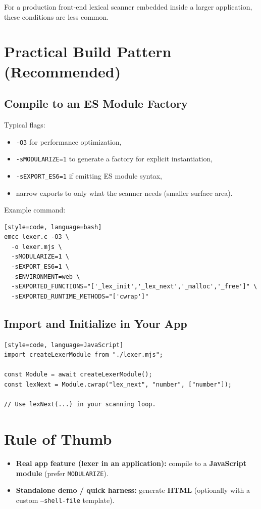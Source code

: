 \documentclass[11pt]{article}
\begin{document}
For a production front-end lexical scanner embedded inside a larger application, these conditions are less common.

\section*{Practical Build Pattern (Recommended)}
\subsection*{Compile to an ES Module Factory}
Typical flags:
\begin{itemize}[leftmargin=*, itemsep=0.25em]
  \item \texttt{-O3} for performance optimization,
  \item \texttt{-sMODULARIZE=1} to generate a factory for explicit instantiation,
  \item \texttt{-sEXPORT\_ES6=1} if emitting ES module syntax,
  \item narrow exports to only what the scanner needs (smaller surface area).
\end{itemize}

\noindent Example command:
\begin{verbatim}[style=code, language=bash]
emcc lexer.c -O3 \
  -o lexer.mjs \
  -sMODULARIZE=1 \
  -sEXPORT_ES6=1 \
  -sENVIRONMENT=web \
  -sEXPORTED_FUNCTIONS="['_lex_init','_lex_next','_malloc','_free']" \
  -sEXPORTED_RUNTIME_METHODS="['cwrap']"
\end{verbatim}

\subsection*{Import and Initialize in Your App}
\begin{verbatim}[style=code, language=JavaScript]
import createLexerModule from "./lexer.mjs";

const Module = await createLexerModule();
const lexNext = Module.cwrap("lex_next", "number", ["number"]);

// Use lexNext(...) in your scanning loop.
\end{verbatim}

\section*{Rule of Thumb}
\begin{itemize}[leftmargin=*, itemsep=0.35em]
  \item \textbf{Real app feature (lexer in an application):} compile to a \textbf{JavaScript module} (prefer \texttt{MODULARIZE}).
  \item \textbf{Standalone demo / quick harness:} generate \textbf{HTML} (optionally with a custom \texttt{--shell\allowbreak-file} template).
\end{itemize}
\end{document}
